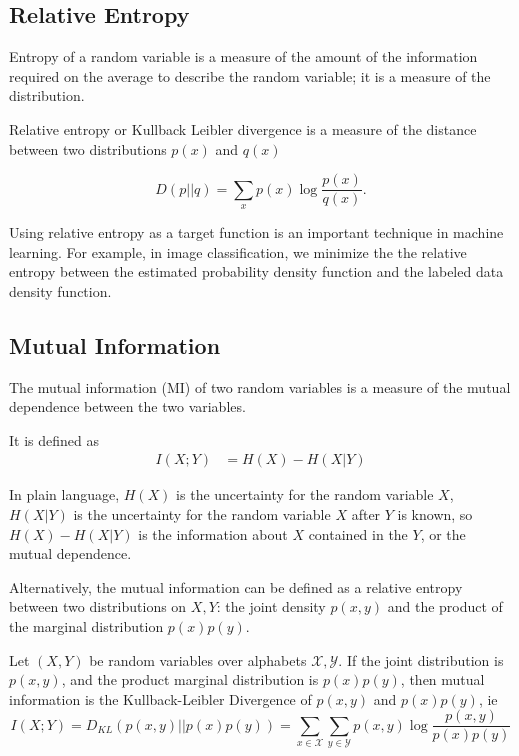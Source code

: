 \subsection{Relative Entropy} 

Entropy of a random variable is a measure of the amount of the information required on the average to describe the random variable; it is a measure of the distribution. 

Relative entropy or Kullback Leibler divergence is a measure of the distance between two distributions \(p(x)\) and \(q(x)\)


\begin{definition}
\begin{equation*}
D(p||q) = \sum_{x} p(x) \log \frac{p(x)}{q(x)}.    
\end{equation*}
\end{definition}

Using relative entropy as a target function is an important technique in machine learning. For example, in image classification, we minimize the the relative entropy between the estimated probability density function and the labeled data density function. 


\subsection{Mutual Information}
The mutual information (MI) of two random variables is a measure of the mutual dependence between the two variables. 

It is defined as
\begin{align}
I(X;Y) &= H(X) - H(X|Y)
\end{align}

In plain language, \(H(X)\) is the uncertainty for the random variable \(X\), \(H(X|Y)\) is the uncertainty for the random variable \(X\) after \(Y\) is known, so \(H(X) - H(X|Y)\) is the information about \(X\) contained in the \(Y\), or the mutual dependence.


Alternatively, the mutual information can be defined as a relative entropy between two distributions on \(X,Y\): the joint density \(p(x,y)\) and the product of the marginal distribution \(p(x)p(y)\).

\begin{definition}
Let \((X,Y)\) be random variables over alphabets \(\mathcal{X}, \mathcal{Y}\). If the joint distribution is \(p(x, y)\), and the product marginal distribution is \(p(x)p(y)\), then mutual information is the Kullback-Leibler Divergence of \(p(x,y)\) and \(p(x)p(y)\), ie
\begin{equation}
    I(X;Y) = D_{KL}(p(x,y)||p(x)p(y)) = \sum_{x\in\mathcal{X}}\sum_{y\in \mathcal{Y}} p(x,y) \log \frac{p(x,y)}{p(x)p(y)}
\end{equation}    
\end{definition}

